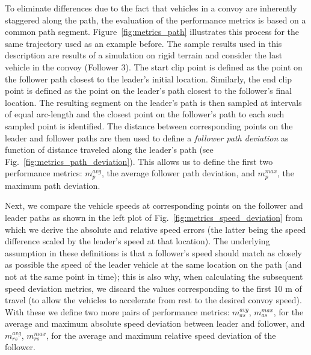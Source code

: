 \documentclass[12pt,twocolumn]{article}
\begin{document}
To eliminate differences due to the fact that vehicles in a convoy are inherently staggered along the path, the evaluation of the performance metrics is based on a common path segment.  Figure~\ref{fig:metrics_path} illustrates this process for the same trajectory used as an example before. The sample results used in this description are results of a simulation on rigid terrain and consider the last vehicle in the convoy (Follower 3).  The start clip point is defined as the point on the follower path closest to the leader's initial location. Similarly, the end clip point is defined as the point on the leader's path closest to the follower's final location.  The resulting segment on the leader's path is then sampled at intervals of equal arc-length and the closest point on the follower's path to each such sampled point is identified. The distance between corresponding points on the leader and follower paths are then used to define a {\em follower path deviation} as function of distance traveled along the leader's path (see Fig.~\ref{fig:metrics_path_deviation}).  This allows us to define the first two performance metrics: $m_{p}^{avg}$, the average follower path deviation, and $m_{p}^{max}$, the maximum path deviation.

Next, we compare the vehicle speeds at corresponding points on the follower and leader paths as shown in the left plot of Fig.~\ref{fig:metrics_speed_deviation} from which we derive the absolute and relative speed errors (the latter being the speed difference scaled by the leader's speed at that location).  The underlying assumption in these definitions is that a follower's speed should match as closely as possible the speed of the leader vehicle at the same location on the path (and not at the same point in time); this is also why, when calculating the subsequent speed deviation metrics, we discard the values corresponding to the first 10 m of travel (to allow the vehicles to accelerate from rest to the desired convoy speed).  With these we define two more pairs of performance metrics: $m_{as}^{avg}$, $m_{as}^{max}$, for the average and maximum absolute speed deviation between leader and follower, and $m_{rs}^{avg}$, $m_{rs}^{max}$, for the average and maximum relative speed deviation of the follower.
\end{document}
